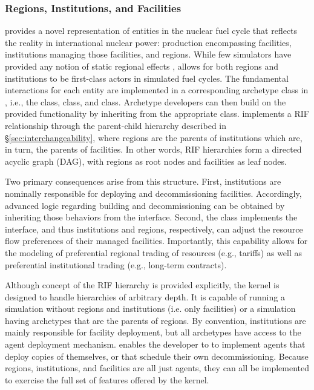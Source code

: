 \subsubsection{Regions, Institutions, and Facilities}

\Cyclus provides a novel representation of entities in the nuclear fuel cycle
that reflects the reality in international nuclear power: production
encompassing facilities, institutions managing those facilities, and regions. While
few simulators have provided any notion of static regional
effects \cite{huff_next_2010,juchau_modeling_2010}, \Cyclus allows for both regions and institutions to be first-class
actors in simulated fuel cycles. The fundamental interactions for each entity are implemented in a corresponding
archetype class in \Cyclus, i.e., the  class, 
class, and  class. Archetype developers can then build on the
provided functionality by inheriting from the appropriate class.
\Cyclus implements a \gls{RIF} relationship through the
parent-child hierarchy described in \S \ref{sec:interchangeability}, where
regions are the parents of institutions which are, in turn, the parents of
facilities. In other words, \gls{RIF} hierarchies form a directed acyclic graph (DAG),
with regions as root nodes and facilities as leaf nodes.

Two primary consequences arise from this structure. First, institutions are
nominally
responsible for deploying and decommissioning facilities. Accordingly, advanced
logic regarding building and decommissioning can be obtained by inheriting
those behaviors from the
 interface. Second, the  class implements the
 interface, and thus institutions and regions, respectively, can
adjust the resource flow preferences of their managed facilities. Importantly,
this capability allows for the modeling of preferential regional trading
of resources (e.g., tariffs) as well as preferential institutional trading
(e.g., long-term contracts).

Although concept of the \gls{RIF} hierarchy is provided explicitly, the \Cyclus kernel is
designed to handle hierarchies of arbitrary depth.  It is capable of
running a simulation without regions and institutions (i.e.  only facilities)
or a simulation having archetypes that are the parents of regions.  By
convention, institutions are mainly responsible for facility deployment, but
all archetypes have access to the agent deployment mechanism. \Cyclus enables
the developer to to implement agents that deploy copies of themselves, or that
schedule their own decommissioning.  Because regions, institutions, and
facilities are all just agents, they can all be implemented to exercise the
full set of features offered by the \Cyclus kernel.

